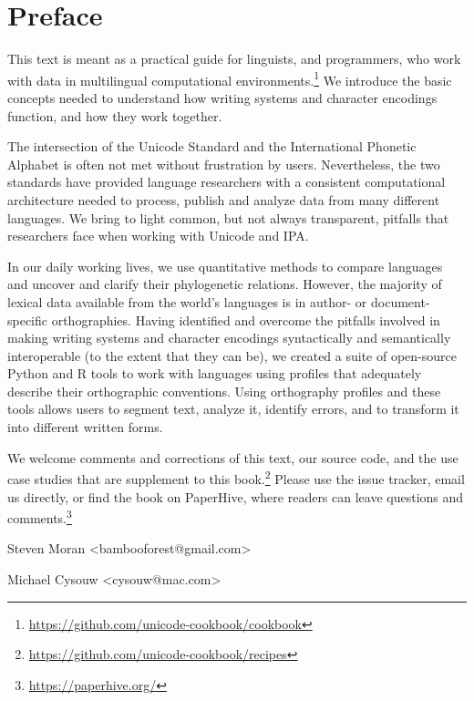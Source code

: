\chapter{Preface}
\label{preface}

This text is meant as a practical guide for linguists, and programmers, who work with data in multilingual computational environments.\footnote{\url{https://github.com/unicode-cookbook/cookbook}} We introduce the basic concepts needed to understand how writing systems and character encodings function, and how they work together.

The intersection of the Unicode Standard and the International Phonetic Alphabet is often not met without frustration by users. Nevertheless, the two standards have provided language researchers with a consistent computational architecture needed to process, publish and analyze data from many different languages. We bring to light common, but not always transparent, pitfalls that researchers face when working with Unicode and IPA. 

In our daily working lives, we use quantitative methods to compare languages and uncover and clarify their phylogenetic relations. However, the majority of lexical data available from the world's languages is in author- or document-specific orthographies. Having identified and overcome the pitfalls involved in making writing systems and character encodings syntactically and semantically interoperable (to the extent that they can be), we created a suite of open-source Python and R tools to work with languages using profiles that adequately describe their orthographic conventions. Using orthography profiles and these tools allows users to segment text, analyze it, identify errors, and to transform it into different written forms.

We welcome comments and corrections of this text, our source code, and the use case studies that are supplement to this book.\footnote{\url{https://github.com/unicode-cookbook/recipes}} Please use the issue tracker, email us directly, or find the book on PaperHive, where readers can leave questions and comments.\footnote{\url{https://paperhive.org/}}

\bigbreak
\noindent Steven Moran {\textless}bambooforest@gmail.com{\textgreater}

\noindent Michael Cysouw {\textless}cysouw@mac.com{\textgreater}

